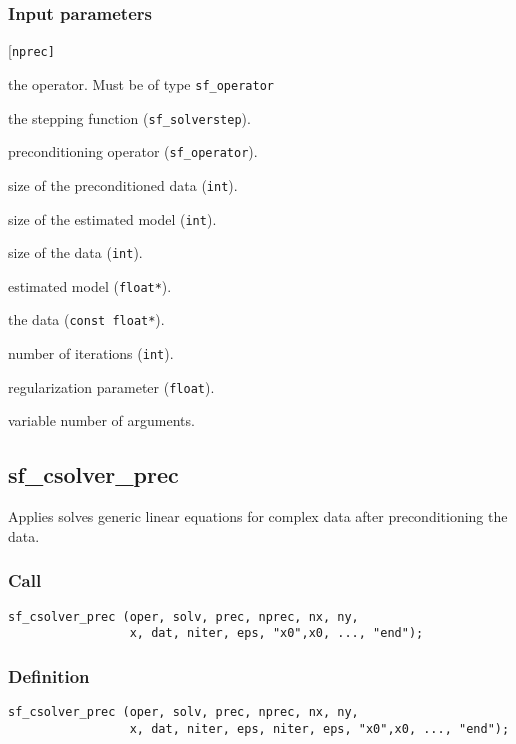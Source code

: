 \subsubsection*{Input parameters}
\begin{desclist}{\tt }{\quad}[\tt nprec]
   \setlength\itemsep{0pt}
   \item[oper]  the operator. Must be of type \texttt{sf\_operator}
   \item[solv]  the stepping function (\texttt{sf\_solverstep}).  
   \item[prec]  preconditioning operator (\texttt{sf\_operator}).   
   \item[nprec] size of the preconditioned data (\texttt{int}).  
   \item[nx]    size of the estimated model  (\texttt{int}).  
   \item[ny]    size of the data  (\texttt{int}).  
   \item[x]     estimated model  (\texttt{float*}).  
   \item[dat]   the data (\texttt{const float*}).  
   \item[niter] number of iterations (\texttt{int}).  
   \item[eps]   regularization parameter (\texttt{float}).  
   \item[...]   variable number of arguments.
\end{desclist}



\subsection{{sf\_csolver\_prec}}
Applies solves generic linear equations for complex data after preconditioning the data.

\subsubsection*{Call}
\begin{verbatim}
sf_csolver_prec (oper, solv, prec, nprec, nx, ny,
                 x, dat, niter, eps, "x0",x0, ..., "end");
\end{verbatim}

\subsubsection*{Definition}
\begin{verbatim}
sf_csolver_prec (oper, solv, prec, nprec, nx, ny,
                 x, dat, niter, eps, niter, eps, "x0",x0, ..., "end");
\end{verbatim}

